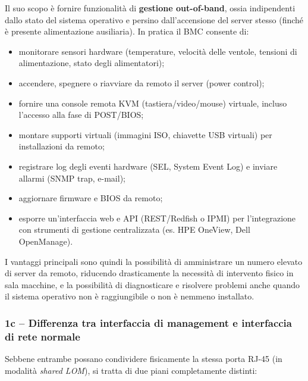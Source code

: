 \documentclass[11pt,a4paper]{article}
\begin{document}
Il suo scopo è fornire funzionalità di \textbf{gestione out-of-band}, ossia indipendenti dallo stato del sistema operativo e persino dall'accensione del server stesso (finché è presente alimentazione ausiliaria). In pratica il BMC consente di:
\begin{itemize}[nosep]
    \item monitorare sensori hardware (temperature, velocità delle ventole, tensioni di alimentazione, stato degli alimentatori);
    \item accendere, spegnere o riavviare da remoto il server (power control);
    \item fornire una console remota KVM (tastiera/video/mouse) virtuale, incluso l'accesso alla fase di POST/BIOS;
    \item montare supporti virtuali (immagini ISO, chiavette USB virtuali) per installazioni da remoto;
    \item registrare log degli eventi hardware (SEL, System Event Log) e inviare allarmi (SNMP trap, e-mail);
    \item aggiornare firmware e BIOS da remoto;
    \item esporre un'interfaccia web e API (REST/Redfish o IPMI) per l'integrazione con strumenti di gestione centralizzata (es. HPE OneView, Dell OpenManage).
\end{itemize}

I vantaggi principali sono quindi la possibilità di amministrare un numero elevato di server da remoto, riducendo drasticamente la necessità di intervento fisico in sala macchine, e la possibilità di diagnosticare e risolvere problemi anche quando il sistema operativo non è raggiungibile o non è nemmeno installato.

\subsubsection{1c -- Differenza tra interfaccia di management e interfaccia di rete normale}

Sebbene entrambe possano condividere fisicamente la stessa porta RJ-45 (in modalità \emph{shared LOM}), si tratta di due piani completamente distinti:
\end{document}
